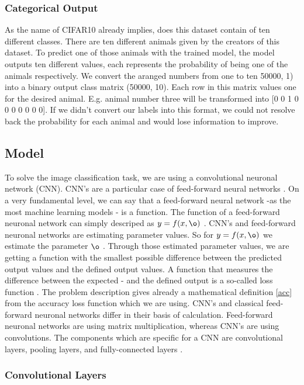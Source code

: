 \documentclass[journal]{IEEEtran}
\begin{document}
\subsubsection{Categorical Output}
As the name of CIFAR10 already implies, does this dataset contain of ten different classes. There are ten different animals given by the creators of this dataset. To predict one of those animals with the trained model, the model outputs ten different values, each represents the probability of being one of the animals respectively. 
We convert the aranged numbers from one to ten 50000, 1) into a binary output class matrix (50000, 10). Each row in this matrix values one for the desired animal. E.g. animal number three will be transformed into [0 0 1 0 0 0 0 0 0 0].
If we didn't convert our labels into this format, we could not resolve back the probability for each animal and would lose information to improve. 

\subsection{Model}
To solve the image classification task, we are using a convolutional neuronal network (CNN). CNN's are a particular case of feed-forward neural networks \cite{Goodfellow-et-al-2016}. On a very fundamental level, we can say that a feed-forward neural network -as the most machine learning models - is a function. The function of a feed-forward neuronal network can simply descriped as \(y = f(x, \o )\) . CNN's and feed-forward neuronal networks are estimating parameter values. So for \(y = f(x, \o )\) we estimate the parameter \(\o \) \cite{Goodfellow-et-al-2016}. Through those estimated parameter values, we are getting a function with the smallest possible difference between the predicted output values and the defined output values. A function that measures the difference between the expected - and the defined output is a so-called loss function \cite{Goodfellow-et-al-2016}. The problem description gives already a mathematical definition \eqref{acc} from the accuracy loss function which we are using. 
CNN's and classical feed-forward neuronal networks differ in their basis of calculation. Feed-forward neuronal networks are using matrix multiplication, whereas CNN's are using convolutions. 
The components which are specific for a CNN are convolutional layers, pooling layers, and fully-connected layers \cite{LeCun1998}.
\subsubsection{Convolutional Layers}
\end{document}
